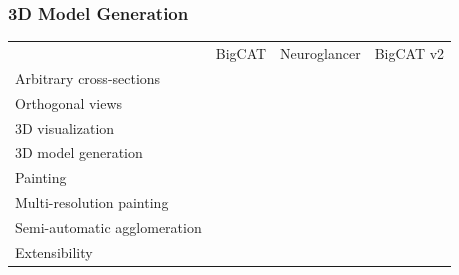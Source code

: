 \documentclass[aspectratio=169,table]{beamer}
\newcommand{\cmark}{\ding{51}}%
\newcommand{\xmark}{\ding{55}}%
\newcommand{\gcmark}{{\color{green}\cmark}}%
\newcommand{\ycmark}{{\color{yellow}\cmark}}%
\newcommand{\rxmark}{{\color{red}\xmark}}%
\begin{document}
\def\colorOne{red}
\def\colorTwo{blue}
\def\colorThree{yellow}
\def\colorFour{green}
\def\colorFive{magenta}
\def\cellSize{1.4em}


\begin{frame}
    \frametitle{3D Model Generation}
    \small
    \vspace{1cm}
    \begin{table}
        \centering
        \begin{tabular}{lccc}
                                       & BigCAT & Neuroglancer & BigCAT v2 \\
          Arbitrary cross-sections     & \gcmark & \gcmark & \gcmark \\
          Orthogonal views             & \rxmark & \gcmark & \gcmark \\ 
          3D visualization             & \rxmark & \gcmark & \gcmark \\ 
          \rowcolor{black!20}  3D model generation          & \rxmark & \rxmark & \gcmark \\ 
          Painting                     & \gcmark & \rxmark & \gcmark \\ 
          Multi-resolution painting         & \rxmark & \rxmark & \gcmark \\ 
          Semi-automatic agglomeration & \rxmark & \rxmark & \gcmark \\ 
          Extensibility                & \rxmark & \ycmark & \gcmark \\
        \end{tabular}
    \end{table}
\end{frame}
\end{document}
